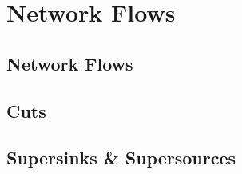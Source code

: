 \documentclass[../alevelmaths.tex]{subfiles}
\begin{document}
\chapter{Network Flows}
\section{Network Flows}
\section{Cuts}
\section{Supersinks \& Supersources}
\end{document}
